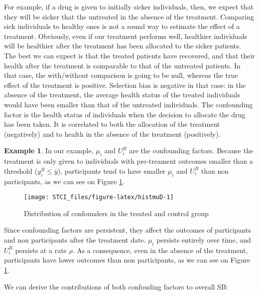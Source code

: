 \documentclass[
]{book}
\theoremstyle{definition}
\theoremstyle{definition}
\newtheorem{example}{Example}[chapter]
\theoremstyle{definition}
\theoremstyle{definition}
\theoremstyle{remark}
\begin{document}
For example, if a drug is given to initially sicker individuals, then, we expect that they will be sicker that the untreated in the absence of the treatment.
Comparing sick individuals to healthy ones is not a sound way to estimate the effect of a treatment.
Obviously, even if our treatment performs well, healthier individuals will be healthier after the treatment has been allocated to the sicker patients.
The best we can expect is that the treated patients have recovered, and that their health after the treatment is comparable to that of the untreated patients.
In that case, the with/without comparison is going to be null, whereas the true effect of the treatment is positive.
Selection bias is negative in that case: in the absence of the treatment, the average health status of the treated individuals would have been smaller than that of the untreated individuals.
The confounding factor is the health status of individuals when the decision to allocate the drug has been taken.
It is correlated to both the allocation of the treatment (negatively) and to health in the absence of the treatment (positively).

\begin{example}
\protect\hypertarget{exm:unnamed-chunk-19}{}{\label{exm:unnamed-chunk-19} }In our example, \(\mu_i\) and \(U_i^B\) are the confounding factors.
Because the treatment is only given to individuals with pre-treament outcomes smaller than a threshold (\(y_i^B\leq\bar{y}\)), participants tend to have smaller \(\mu_i\) and \(U_i^B\) than non participants, as we can see on Figure \ref{fig:histmuD}.
\end{example}

\begin{figure}[htbp]

{\centering \texttt{[image: STCI\_files/figure-latex/histmuD-1]} 

}

\caption{Distribution of confounders in the treated and control group}\label{fig:histmuD}
\end{figure}

Since confounding factors are persistent, they affect the outcomes of participants and non participants after the treatment date.
\(\mu_i\) persists entirely over time, and \(U_i^B\) persists at a rate \(\rho\).
As a consequence, even in the absence of the treatment, participants have lower outcomes than non participants, as we can see on Figure \ref{fig:histmuD}.

We can derive the contributions of both confouding factors to overall SB:
\end{document}
